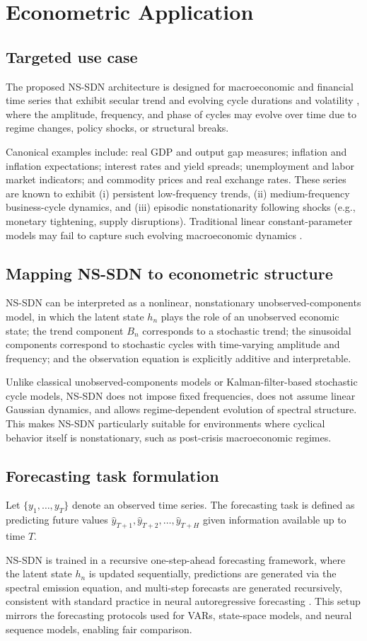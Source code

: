 \section{Econometric Application}
\subsection{Targeted use case}
The proposed NS-SDN architecture is designed for macroeconomic and financial time series that exhibit secular trend and evolving cycle durations and volatility \citep{hamilton1989,lubik2015}, where the amplitude, frequency, and phase of cycles may evolve over time due to regime changes, policy shocks, or structural breaks.

Canonical examples include: real GDP and output gap measures; inflation and inflation expectations; interest rates and yield spreads; unemployment and labor market indicators; and commodity prices and real exchange rates. These series are known to exhibit (i) persistent low-frequency trends, (ii) medium-frequency business-cycle dynamics, and (iii) episodic nonstationarity following shocks (e.g., monetary tightening, supply disruptions). Traditional linear constant-parameter models may fail to capture such evolving macroeconomic dynamics \citep{lubik2015}.

\subsection{Mapping NS-SDN to econometric structure}
NS-SDN can be interpreted as a nonlinear, nonstationary unobserved-components model, in which the latent state $h_n$ plays the role of an unobserved economic state; the trend component $B_n$ corresponds to a stochastic trend; the sinusoidal components correspond to stochastic cycles with time-varying amplitude and frequency; and the observation equation is explicitly additive and interpretable.

Unlike classical unobserved-components models or Kalman-filter-based stochastic cycle models, NS-SDN does not impose fixed frequencies, does not assume linear Gaussian dynamics, and allows regime-dependent evolution of spectral structure. This makes NS-SDN particularly suitable for environments where cyclical behavior itself is nonstationary, such as post-crisis macroeconomic regimes.

\subsection{Forecasting task formulation}
Let $\{y_1, \dots, y_T\}$ denote an observed time series. The forecasting task is defined as predicting future values $\hat y_{T+1}, \hat y_{T+2}, \dots, \hat y_{T+H}$ given information available up to time $T$.

NS-SDN is trained in a recursive one-step-ahead forecasting framework, where the latent state $h_n$ is updated sequentially, predictions are generated via the spectral emission equation, and multi-step forecasts are generated recursively, consistent with standard practice in neural autoregressive forecasting \citep{salinas2020}. This setup mirrors the forecasting protocols used for VARs, state-space models, and neural sequence models, enabling fair comparison.


